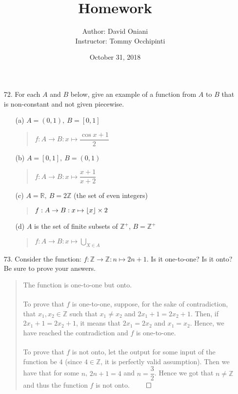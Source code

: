 \documentclass[12pt, a4paper]{article}
\title{\bf{Homework \textnumero 10}}
\author{Author: David Oniani
\\
\ \ \ Instructor: Tommy Occhipinti}
\date{October 31, 2018}
\newcommand{\ints}{\mathbb{Z}}
\newcommand{\reals}{\mathbb{R}}
\newcommand{\pints}{\mathbb{Z}^+}
\newcommand\und[1]{\underline{\smash{#1}}}
\DeclarePairedDelimiter\floor{\lfloor}{\rfloor}
\begin{document}
\maketitle

\begin{itemize}
\item[72.]
For each $A$ and $B$ below, give an example of a function from $A$ to $B$ that is non-constant and not given piecewise.
\begin{itemize}
\item[(a)]
$A = (0, 1), \ B = [0, 1]$
\begin{quote}
$f : A \rightarrow B : x \mapsto \dfrac{\cos{x} + 1}{2}$
\end{quote}

\item[]

\item[(b)]
$A = [0, 1], \ B = (0, 1)$
\begin{quote}
$f : A \rightarrow B : x \mapsto \dfrac{x + 1}{x + 2}$
\end{quote}

\item[]

\item[(c)]
$A = \reals, \ B = 2 \ints$ (the set of even integers)
\begin{quote}
$f : A \rightarrow B : x \mapsto \floor{x} \times 2$
\end{quote}

\item[]

\item[(d)]
$A$ is the set of finite subsets of $\pints$, $B = \pints$
\begin{quote}
$f : A \rightarrow B : x \mapsto \bigcup_{X \in A}$
\end{quote}
\end{itemize}

\item[]
\item[]

\item[73.]
Consider the function: $f : \ints \rightarrow \ints : n \mapsto 2n + 1$. Is it one-to-one? Is it onto?
Be sure to prove your answers.
\begin{quote}
The function is one-to-one but \und{NOT} onto.
\\\\
To prove that $f$ is one-to-one, suppose, for the sake of contradiction, that $x_1, x_2 \in \ints$ such that $x_1 \neq x_2$
and $2x_1 + 1 = 2x_2 + 1$. Then, if $2x_1 + 1 = 2x_2 + 1$, it means that $2x_1 = 2x_2$ and $x_1 = x_2$. Hence, we have reached
the contradiction and $f$ is one-to-one.
\\\\
To prove that $f$ is not onto, let the output for some input of the function be $4$ (since $4 \in \ints$, it is perfectly valid assumption).
Then we have that for some $n$, $2n + 1 = 4$
and $n = \dfrac{3}{2}$. Hence we got that $n \neq \mathbb{Z}$ and thus the function $f$ is not onto.
$\qed$
\end{quote}


\end{itemize}
\end{document}

